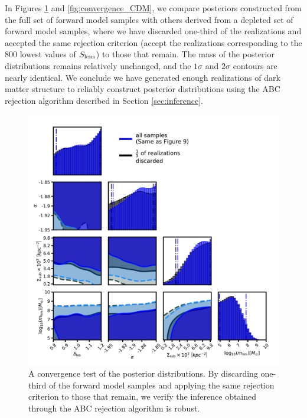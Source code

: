 In Figures \ref{fig:convergence} and \ref{fig:convergence_CDM}, we compare posteriors constructed from the full set of forward model samples with others derived from a depleted set of forward model samples, where we have discarded one-third of the realizations and accepted the same rejection criterion (accept the realizations corresponding to the 800 lowest values of $S_{\rm{lens}}$) to those that remain. The mass of the posterior distributions remains relatively unchanged, and the $1 \sigma$ and $2 \sigma$ contours are nearly identical. We conclude we have generated enough realizations of dark matter structure to reliably construct posterior distributions using the ABC rejection algorithm described in Section \ref{sec:inference}. 

\begin{figure}
	\includegraphics[clip,trim=0cm 0cm 0cm
	0cm,width=.95\textwidth,keepaspectratio]{./figures_wdmchillsout/convergence_test.pdf}
	\caption[Convergence test of the posteriors]{\label{fig:convergence} A convergence test of the posterior distributions. By discarding one-third of the forward model samples and applying the same rejection criterion to those that remain, we verify the inference obtained through the ABC rejection algorithm is robust. }
\end{figure}

